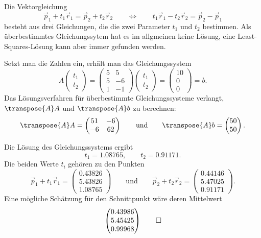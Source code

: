 \begin{loesung}
\begin{teilaufgaben}
\item
Die Vektorgleichung
\[
\vec p_1+t_1\vec r_1 = \vec p_2 + t_2\vec r_2
\qquad\Leftrightarrow\qquad
t_1\vec r_1 - t_2\vec r_2 = \vec p_2 -\vec p_1
\]
besteht aus drei Gleichungen, die die zwei Parameter $t_1$ und $t_2$ 
bestimmen. 
Als überbestimmtes Gleichungssytem hat es im allgmeinen keine
Lösung, eine Least-Squares-Lösung kann aber immer gefunden werden.

Setzt man die Zahlen ein, erhält man das Gleichungssystem
\[
A
\begin{pmatrix}
t_1\\t_2
\end{pmatrix}
=
\begin{pmatrix}
5& 5\\
5&-6\\
1&-1
\end{pmatrix}
\begin{pmatrix}
t_1\\t_2
\end{pmatrix}
=
\begin{pmatrix}
10\\0\\0
\end{pmatrix}
=
b.
\]
Das Lösungsverfahren für überbestimmte Gleichungssysteme verlangt,
$\transpose{A}A$ und $\transpose{A}b$ zu berechnen:
\[
\transpose{A}A=\begin{pmatrix}51&-6\\-6&62\end{pmatrix}
\qquad\text{und}\qquad
\transpose{A}b=\begin{pmatrix}50\\50\end{pmatrix}.
\]
\item
Die Lösung des Gleichungssystems ergibt
\[
t_1 = 1.08765,
\qquad
t_2 = 0.91171.
\]
Die beiden Werte $t_i$ gehören zu den Punkten
\[
\vec p_1+t_1\vec r_1
=
\begin{pmatrix}
   0.43826\\
   5.43826\\
   1.08765
\end{pmatrix}
\qquad\text{und}\qquad
\vec p_2+t_2\vec r_2
=
\begin{pmatrix}
   0.44146\\
   5.47025\\
   0.91171
\end{pmatrix}.
\]
Eine mögliche Schätzung für den Schnittpunkt wäre deren Mittelwert
\begin{equation}
\begin{pmatrix}
   0.43986\\
   5.45425\\
   0.99968
\end{pmatrix}
\label{40000017:loes}
\qedhere
\end{equation}
\end{teilaufgaben}
\end{loesung}

